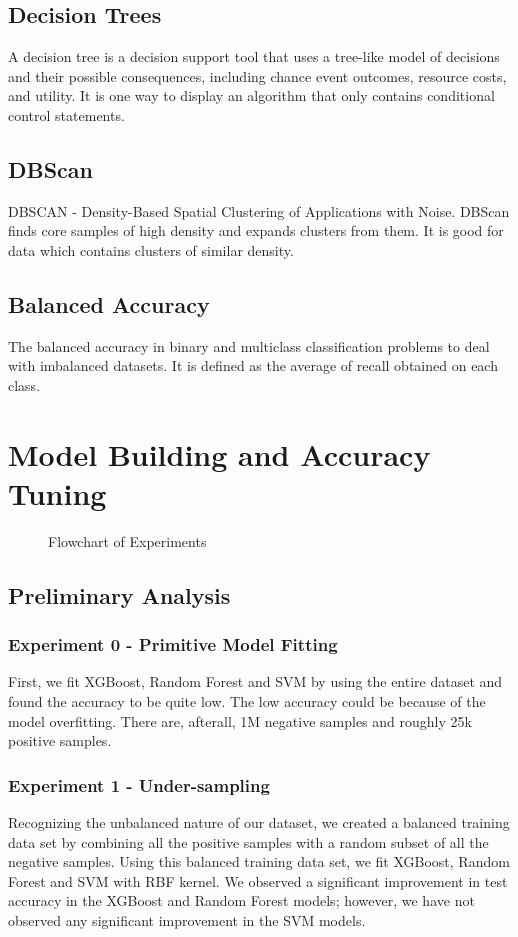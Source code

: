 \documentclass[10pt]{article}
\begin{document}
\subsection{Decision Trees}
A decision tree is a decision support tool that uses a tree-like model of
decisions and their possible consequences, including chance event outcomes,
resource costs, and utility. It is one way to display an algorithm that
only contains conditional control statements.\par
\subsection{DBScan}
DBSCAN - Density-Based Spatial Clustering of Applications with Noise.
DBScan finds core samples of high density and expands clusters from them.
It is good for data which contains clusters of similar density.
\subsection{Balanced Accuracy}
The balanced accuracy in binary and multiclass classification problems to
deal with imbalanced datasets. It is defined as the average of recall
obtained on each class.

\section{Model Building and Accuracy Tuning}
\begin{figure}[H]
    \centering
    
    \caption{Flowchart of Experiments}
\end{figure}
\subsection{Preliminary Analysis}
\subsubsection{Experiment 0 - Primitive Model Fitting}
First, we fit XGBoost, Random Forest and SVM by using the entire dataset
and found the accuracy to be quite low. The low accuracy could be because
of the model overfitting. There are, afterall, 1M negative samples and
roughly 25k positive samples.\par
\subsubsection{Experiment 1 - Under-sampling}
Recognizing the unbalanced nature of our dataset, we created a balanced
training data set by combining all the positive samples with a random
subset of all the negative samples. Using this balanced training data set,
we fit XGBoost, Random Forest and SVM with RBF kernel. We observed a
significant improvement in test accuracy in the XGBoost and Random Forest
models; however, we have not observed any significant improvement in the
SVM models.\par
\begin{table}[H]
    \centering
    
\end{table}
\end{document}
